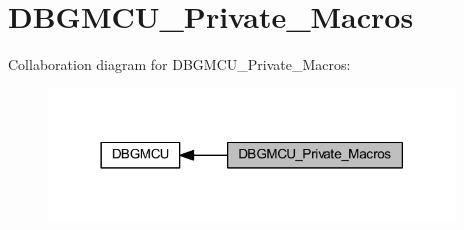 \hypertarget{group___d_b_g_m_c_u___private___macros}{}\section{D\+B\+G\+M\+C\+U\+\_\+\+Private\+\_\+\+Macros}
\label{group___d_b_g_m_c_u___private___macros}
Collaboration diagram for D\+B\+G\+M\+C\+U\+\_\+\+Private\+\_\+\+Macros\+:
\nopagebreak
\begin{figure}[H]
\begin{center}
\leavevmode
\includegraphics[width=306pt]{group___d_b_g_m_c_u___private___macros}
\end{center}
\end{figure}
